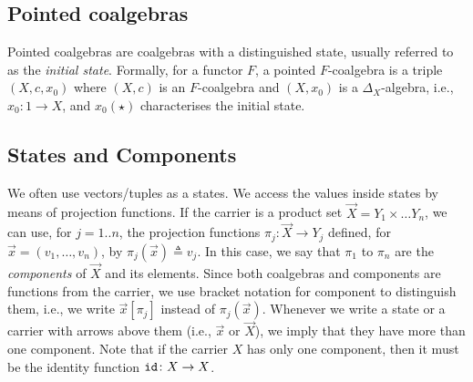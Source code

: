 \subsection{Pointed coalgebras}
Pointed coalgebras are coalgebras with a distinguished state, usually referred to as the \emph{initial state}. Formally, for a functor $F$, a pointed $F$-coalgebra is a triple $(X,c, x_0)$ where $(X,c)$ is an $F$-coalgebra and $(X, x_0)$ is a $\Delta_X$-algebra, i.e., $x_0\colon 1\rightarrow X$, and $x_0(\star)$ characterises the initial state.
\subsection{States and Components}
We often use vectors/tuples as a states. We access the values inside states by means of projection functions. If the carrier is a product set $\vec{X}=Y_1 \times\ldots Y_n$, we can use, for $j=1..n$, the projection functions $\pi_j\colon \vec{X}\rightarrow Y_j$ defined, for $\vec{x}=(v_1,\ldots,v_n)$, by $\pi_j(\vec{x})\triangleq v_j$. In this case, we say that $\pi_1$ to $\pi_n$ are the \emph{components} of $\vec{X}$ and its elements. Since both coalgebras and components are functions from the carrier, we use bracket notation for component to distinguish them, i.e., we write $\vec{x}[\pi_j]$ instead of $\pi_j(\vec{x})$.  %
Whenever we write a state or a carrier  with arrows above them (i.e., $\vec{x}$ or $\vec{X}$), we imply that they have more than one component. Note that if the carrier $X$ has only one component, then it must be the identity function ${\texttt{id}}\colon X\rightarrow X$. 
%
